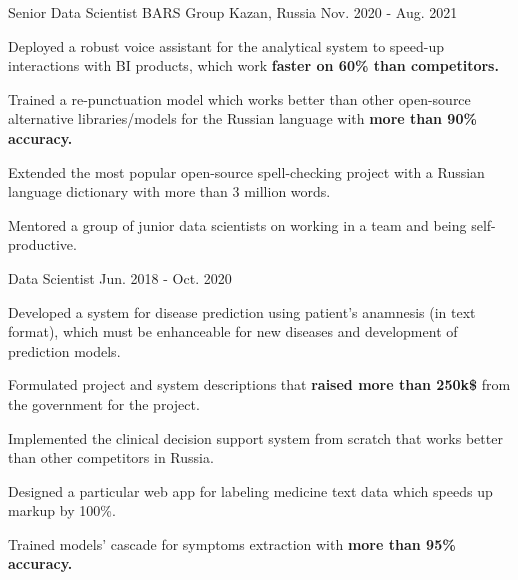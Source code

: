 \begin{cventries}
  \cventry
    {Senior Data Scientist} %
    {BARS Group} %
    {Kazan, Russia} %
    {Nov. 2020 - Aug. 2021} %
    {
      \begin{cvitems} %
        \item {Deployed a robust voice assistant for the analytical system to speed-up interactions with BI products, which work \textbf{faster on 60\% than competitors.}}
        \item {Trained a re-punctuation model which works better than other open-source alternative libraries/models for the Russian language with \textbf{more than 90\% accuracy.}}
        \item {Extended the most popular open-source spell-checking project with a Russian language dictionary with more than 3 million words.}
        \item {Mentored a group of junior data scientists on working in a team and being self-productive.}
      \end{cvitems}
    }

  \cventry
    {Data Scientist} %
    {} %
    {} %
    {Jun. 2018 - Oct. 2020} %
    {
      \begin{cvitems} %
        \item {Developed a system for disease prediction using patient's anamnesis (in text format), which must be enhanceable for new diseases and development of prediction models.}
        \item {Formulated project and system descriptions that \textbf{raised more than 250k\$} from the government for the project.}
        \item {Implemented the clinical decision support system from scratch that works better than other competitors in Russia.}
        \item {Designed a particular web app for labeling medicine text data which speeds up markup by 100\%.}
        \item {Trained models' cascade for symptoms extraction with \textbf{more than 95\% accuracy.}}
      \end{cvitems}
    }


\end{cventries}
